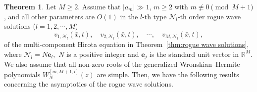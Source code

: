 \documentclass[preprint,3p,10pt]{elsarticle}
\theoremstyle{definition}
\newtheorem{theorem}{Theorem}[section]
\begin{document}
\begin{theorem} \label{thm:Rogue wave patterns}
Let $M\ge2$. Assume that $|a_m|\gg1$, $m\geq 2$ with $m \not \equiv0 \pmod{M+1}$, and all other parameters are $O(1)$ in the $l$-th type $\mathcal{N}_l$-th order rogue wave solutions ($l =1,2,\cdots,M$)
\begin{equation}\label{RW solution-(1,1) type}
  v_{1, \mathcal{N}_l}(\bar{x}, t), \quad v_{2, \mathcal{N}_l}(\bar{x}, t), \quad \cdots, \quad v_{M, \mathcal{N}_l}(\bar{x}, t),
\end{equation}
of the multi-component Hirota equation in Theorem~\ref{thm:rogue wave solutions}, where $\mathcal{N}_l=N  \mathbf{e}_{l},$
 $N$ is a positive integer and $\mathbf{e}_j$ is the standard unit vector in $\mathbb{R}^M$. We also assume that all non-zero roots of the generalized Wronskian--Hermite polynomials $W_N^{[m,M+1,l]}(z)$ are simple.
Then, we have the following results concerning the asymptotics of the rogue wave solutions.


\end{theorem}
\end{document}
